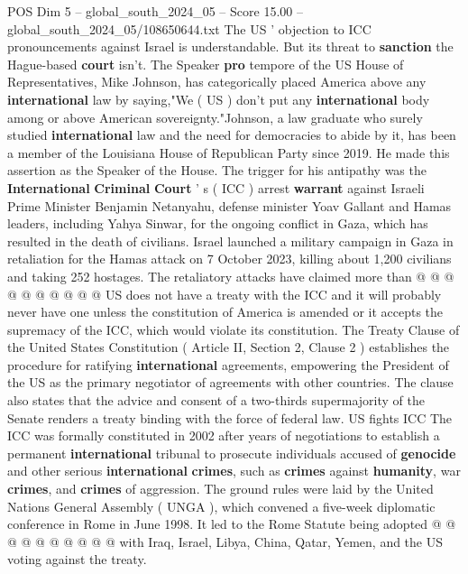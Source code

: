 \begin{textsample}{POS Dim 5 – global\_south\_2024\_05 – Score 15.00 – global\_south\_2024\_05/108650644.txt}  \label{ex:f5_pos_125}
The US ' objection to ICC pronouncements against Israel is understandable.
But its threat to \textbf{sanction} the Hague-based \textbf{court} isn't.
The Speaker \textbf{pro} tempore of the US House of Representatives, Mike Johnson, has categorically placed America above any \textbf{international} law by saying,"We ( US ) don't put any \textbf{international} body among or above American sovereignty."Johnson, a law graduate who surely studied \textbf{international} law and the need for democracies to abide by it, has been a member of the Louisiana House of Republican Party since 2019.
He made this assertion as the Speaker of the House.
The trigger for his antipathy was the \textbf{International} \textbf{Criminal} \textbf{Court} ' s ( ICC ) arrest \textbf{warrant} against Israeli Prime Minister Benjamin Netanyahu, defense minister Yoav Gallant and Hamas leaders, including Yahya Sinwar, for the ongoing conflict in Gaza, which has resulted in the death of civilians.
Israel launched a military campaign in Gaza in retaliation for the Hamas attack on 7 October 2023, killing about 1,200 civilians and taking 252 hostages.
The retaliatory attacks have claimed more than @ @ @ @ @ @ @ @ @ @ US does not have a treaty with the ICC and it will probably never have one unless the constitution of America is amended or it accepts the supremacy of the ICC, which would violate its constitution.
The Treaty Clause of the United States Constitution ( Article II, Section 2, Clause 2 ) establishes the procedure for ratifying \textbf{international} agreements, empowering the President of the US as the primary negotiator of agreements with other countries.
The clause also states that the advice and consent of a two-thirds supermajority of the Senate renders a treaty binding with the force of federal law.
US fights ICC The ICC was formally constituted in 2002 after years of negotiations to establish a permanent \textbf{international} tribunal to prosecute individuals accused of \textbf{genocide} and other serious \textbf{international} \textbf{crimes}, such as \textbf{crimes} against \textbf{humanity}, war \textbf{crimes}, and \textbf{crimes} of aggression.
The ground rules were laid by the United Nations General Assembly ( UNGA ), which convened a five-week diplomatic conference in Rome in June 1998.
It led to the Rome Statute being adopted @ @ @ @ @ @ @ @ @ @ with Iraq, Israel, Libya, China, Qatar, Yemen, and the US voting against the treaty.

\end{textsample}
